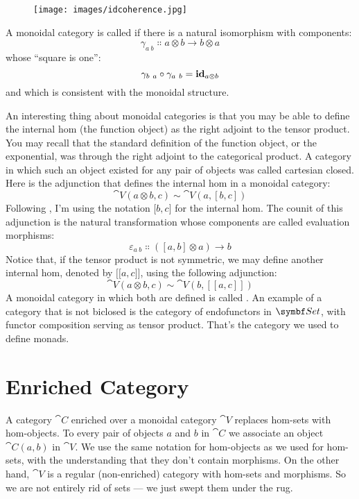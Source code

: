 \begin{figure}[H]
\centering
\texttt{[image: images/idcoherence.jpg]}
\end{figure}

\noindent
A monoidal category is called  if there is a natural
isomorphism with components:
\[\gamma_{a\ b} \Colon a \otimes b \to b \otimes a\]
whose ``square is one'':
\[\gamma_{b\ a} \circ \gamma_{a\ b} = \idarrow[a \otimes b]\]
and which is consistent with the monoidal structure.

An interesting thing about monoidal categories is that you may be able
to define the internal hom (the function object) as the right adjoint to
the tensor product. You may recall that the standard definition of the
function object, or the exponential, was through the right adjoint to
the categorical product. A category in which such an object existed for
any pair of objects was called cartesian closed. Here is the adjunction
that defines the internal hom in a monoidal category:
\[\cat{V}(a \otimes b, c) \sim \cat{V}(a, [b, c])\]
Following
, I'm using the notation ${[}b, c{]}$ for the internal
hom. The counit of this adjunction is the natural transformation whose
components are called evaluation morphisms:
\[\varepsilon_{a\ b} \Colon ([a, b] \otimes a) \to b\]
Notice that, if the tensor product is not symmetric, we may define
another internal hom, denoted by ${[}{[}a, c{]}{]}$, using the
following adjunction:
\[\cat{V}(a \otimes b, c) \sim \cat{V}(b, [[a, c]])\]
A monoidal category in which both are defined is called . An
example of a category that is not biclosed is the category of
endofunctors in $\Set$, with functor composition serving as tensor
product. That's the category we used to define monads.

\section{Enriched Category}

A category $\cat{C}$ enriched over a monoidal category $\cat{V}$ replaces
hom-sets with hom-objects. To every pair of objects $a$ and
$b$ in $\cat{C}$ we associate an object $\cat{C}(a, b)$ in
$\cat{V}$. We use the same notation for hom-objects as we used for
hom-sets, with the understanding that they don't contain morphisms. On
the other hand, $\cat{V}$ is a regular (non-enriched) category with
hom-sets and morphisms. So we are not entirely rid of sets --- we just
swept them under the rug.

